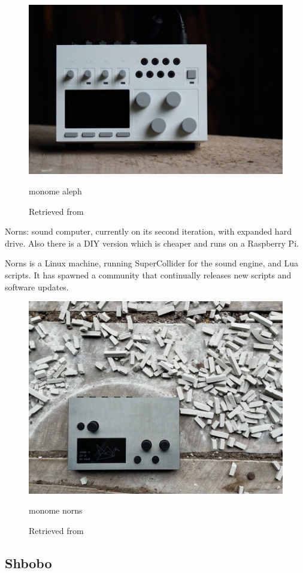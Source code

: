 \begin{figure}[ht]
  \centering
  \includegraphics[width=0.75\linewidth,height=0.25\textheight,keepaspectratio]{images/monome-aleph.jpg}
  \caption{monome aleph}
  \caption*{Retrieved from \cite{website-monome-current}}
  \label{fig:monome-aleph}
\end{figure}

Norns: sound computer, currently on its second iteration, with expanded hard drive. Also there is a DIY version which is cheaper and runs on a Raspberry Pi.

Norns is a Linux machine, running SuperCollider for the sound engine, and Lua scripts. It has spawned a community that continually releases new scripts and software updates.

\begin{figure}[ht]
  \centering
  \includegraphics[width=0.75\linewidth,height=0.25\textheight,keepaspectratio]{images/monome-norns.jpg}
  \caption{monome norns}
  \caption*{Retrieved from \cite{website-monome-current}}
  \label{fig:monome-norns}
\end{figure}

\subsection{Shbobo}

